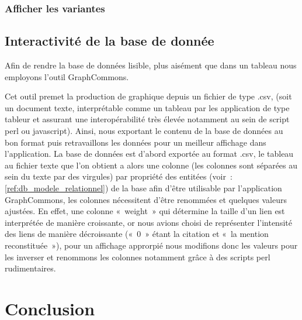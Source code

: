 \documentclass[12pt, a4paper]{article}
\begin{document}

\subsubsection{Afficher les variantes}


    \subsection{Interactivité de la base de donnée}


Afin de rendre la base de données lisible, plus aisément que dans un tableau nous employons l'outil GraphCommons.

Cet outil premet la production de graphique depuis un fichier de type .csv, (soit un document texte, interprétable comme un tableau par les application de type tableur et assurant une interopérabilité très élevée notamment au sein de script perl ou javascript). Ainsi, nous exportant le contenu de la base de données au bon format puis retravaillons les données pour un meilleur affichage dans l'application.
La base de données est d'abord exportée au format .csv, le tableau au fichier texte que l'on obtient a alors une colonne (les colonnes sont séparées au sein du texte par des virgules) par propriété des entitées (voir~: \ref{ref:db_modele_relationnel}) de la base afin d'être utilisable par l'application GraphCommons, les colonnes nécessitent d'être renommées et quelques valeurs ajustées. En effet, une colonne «~weight~» qui détermine la taille d'un lien est interprétée de manière croissante, or nous avions choisi de représenter l'intensité des liens de manière décroissante («~0~» étant la citation et «~la mention reconstituée~»), pour un affichage approrpié nous modifions donc les valeurs pour les inverser et renommons les colonnes notamment grâce à des scripts perl rudimentaires.









\section{Conclusion}
\end{document}
